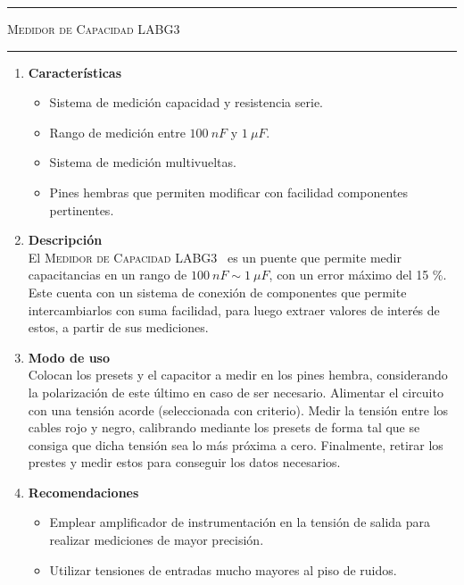 \begin{center}
\rule{\textwidth}{1pt}
\textsc{Medidor de Capacidad LABG3 \textsuperscript{\textregistered}}
\rule{\textwidth}{1pt}
\end{center}

\begin{multicols}{2}

\begin{enumerate}
	\item[1] \textbf{Características}
	\begin{itemize}
		\item Sistema de medición capacidad y resistencia serie.
		\item Rango de medición entre $100 \ nF$ y $1 \ \mu F$.
		\item Sistema de medición multivueltas.
		\item Pines hembras que permiten modificar con facilidad componentes pertinentes.
	\end{itemize}
	
	\item[2] \textbf{Descripción}\\
		El \textsc{Medidor de Capacidad LABG3~\textsuperscript{\textregistered}} es un puente que permite medir capacitancias en un rango de $100 \ nF \sim 1 \ \mu F$, con un error máximo del 15 \%. Este cuenta con un sistema de conexión de componentes que permite intercambiarlos con suma facilidad, para luego extraer valores de interés de estos, a partir de sus mediciones.
	
	\item[3] \textbf{Modo de uso}\\
	Colocan los presets y el capacitor a medir en los pines hembra, considerando la polarización de este último en caso de ser necesario. Alimentar el circuito con una tensión acorde (seleccionada con criterio). Medir la tensión entre los cables rojo y negro, calibrando mediante los presets de forma tal que se consiga que dicha tensión sea lo más próxima a cero. Finalmente, retirar los prestes y medir estos para conseguir los datos necesarios.
		
	\item[4] \textbf{Recomendaciones}
		\begin{itemize}
		\item Emplear amplificador de instrumentación en la tensión de salida para realizar mediciones de mayor precisión.
		\item Utilizar tensiones de entradas mucho mayores al piso de ruidos.
	\end{itemize}

\end{enumerate}
\end{multicols}
